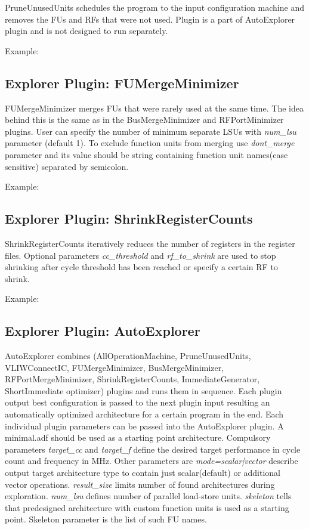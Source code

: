 \documentclass[a4paper,twoside]{tceusermanual}
\begin{document}
PruneUnusedUnits schedules the program to the input configuration machine and 
removes the FUs and RFs that were not used. Plugin is a part of AutoExplorer plugin and is not designed to run separately.

Example:

\subsection{Explorer Plugin: FUMergeMinimizer}

FUMergeMinimizer merges FUs that were rarely used at the same time. The idea 
behind this is the same as in the BusMergeMinimizer and RFPortMinimizer plugins. 
User can specify the number of minimum separate LSUs with \textit{num\_lsu} 
parameter (default 1). To exclude function units from merging use 
\textit{dont\_merge} parameter and its value should be string containing 
function unit names(case sensitive) separated by semicolon.

Example:

\subsection{Explorer Plugin: ShrinkRegisterCounts}

ShrinkRegisterCounts iteratively reduces the number of registers in the register 
files. Optional parameters \textit{cc\_threshold} and \textit{rf\_to\_shrink} are used to stop shrinking after cycle threshold has been reached or specify a certain RF to shrink.

Example:

\subsection{Explorer Plugin: AutoExplorer}

AutoExplorer combines (AllOperationMachine, PruneUnusedUnits, VLIWConnectIC, 
FUMergeMinimizer, BusMergeMinimizer, RFPortMergeMinimizer, 
ShrinkRegisterCounts, ImmediateGenerator, ShortImmediate optimizer) plugins and runs them in sequence. 
Each plugin output best configuration is passed to the next plugin input 
resulting an automatically optimized architecture for a certain program in the 
end. Each individual plugin parameters can be passed into the AutoExplorer 
plugin. A minimal.adf should be used as a starting point architecture. Compulsory parameters \textit{target\_cc} 
and \textit{target\_f} define the desired target performance in cycle count and frequency in MHz. 
Other parameters are \textit{mode=scalar|vector} describe output target architecture type to contain just scalar(default) or additional vector operations.
\textit{result\_size} limits number of found architectures during exploration.
\textit{num\_lsu} defines number of parallel load-store units.
\textit{skeleton} tells that predesigned architecture with custom function units is used as a starting point. Skeleton parameter is the list of such FU names.
\end{document}
